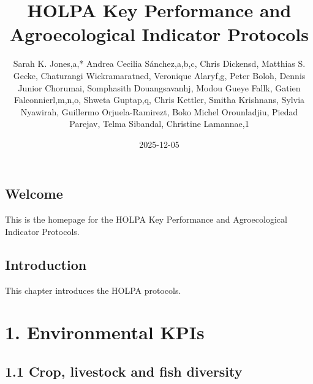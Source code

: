 \documentclass[
  letterpaper,
  DIV=11,
  numbers=noendperiod]{scrreprt}
\title{HOLPA Key Performance and Agroecological Indicator Protocols}
\author{Sarah K. Jones,a,* Andrea Cecilia Sánchez,a,b,c, Chris Dickensd,
Matthias S. Gecke, Chaturangi Wickramaratned, Veronique Alaryf,g, Peter
Boloh, Dennis Junior Chorumai, Somphasith Douangsavanhj, Modou Gueye
Fallk, Gatien Falconnierl,m,n,o, Shweta Guptap,q, Chris Kettler, Smitha
Krishnans, Sylvia Nyawirah, Guillermo Orjuela-Ramirezt, Boko Michel
Orounladjiu, Piedad Parejav, Telma Sibandal, Christine Lamannae,1}
\date{2025-12-05}
\renewcommand*\contentsname{Table of contents}
\newcommand\contentsname{Table of contents}
\begin{document}
\maketitle

\renewcommand*\contentsname{Table of contents}
{
\hypersetup{linkcolor=}
\setcounter{tocdepth}{2}
\tableofcontents
}


\chapter*{Welcome}\label{welcome}


This is the homepage for the HOLPA Key Performance and Agroecological
Indicator Protocols.


\chapter{Introduction}\label{introduction}

This chapter introduces the HOLPA protocols.

\part{1. Environmental KPIs}

\chapter{1.1 Crop, livestock and fish
diversity}\label{crop-livestock-and-fish-diversity}
\end{document}
